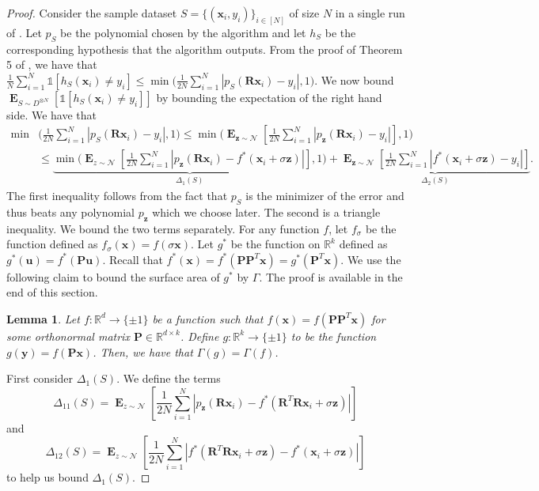 \documentclass[10pt,a4paper]{article}
\newtheorem{lemma}{Lemma}[section]
\renewcommand\vec[1]{\mathbf{#1}}
\DeclareMathOperator*{\E}{\mathbf{E}}
\newcommand{\R}{\mathbb{R}}
\newcommand{\1}{\Ind}
\newcommand{\x}{\vec x}
\newcommand{\z}{\vec z}
\newcommand{\Gauss}{\mathcal{N}}
\newcommand{\ind}{\mathds{1}}
\begin{document}
\begin{proof}
Consider the sample dataset $S=\{(\x_i,y_i)\}_{i\in [N]}$ of size $N$ in a single run of . Let $p_S$ be the polynomial chosen by the algorithm and let $h_S$ be the corresponding hypothesis that the algorithm outputs. From the proof of Theorem 5 of \cite{KKMS:05}, we have that 
$\frac{1}{N}\sum_{i=1}^{N}\ind[h_S(\x_i)\neq y_i]\leq \min\bigl(\frac{1}{2N}\sum_{i=1}^{N}|p_S(\vec R\x_i)-y_i|,1\bigr)$. We now bound $\E_{S\sim D^{\otimes N}}\left[\ind[h_S(\x_i)\neq y_i]\right]$ by bounding the expectation of the right hand side. We have that  
\begin{align*}
\min&\biggl(\frac{1}{2N}\sum_{i=1}^{N}|p_S(\vec R\x_i)-y_i|,1\biggr)
\leq \min\biggl(\E_{\z\sim \Gauss}\left[\frac{1}{2N}\sum_{i=1}^{N}|p_{\z}(\vec R\x_i)-y_i|\right],1\biggr)
\\
&\leq \underbrace{\min\biggl(\E_{z\sim \Gauss}\left[\frac{1}{2N}\sum_{i=1}^{N}|p_{\z}(\vec R\x_i)-f^*(\x_i+\sigma \z)|\right],1\biggr)}_{\Delta_1(S)}+\underbrace{\E_{\z\sim \Gauss}\left[\frac{1}{2N}\sum_{i=1}^{N}|f^*(\x_i+\sigma \z)-y_i|\right]}_{\Delta_2(S)}.
\end{align*}
The first inequality follows from the fact that $p_S$ is the minimizer of the error and thus beats any polynomial $p_{\z}$ which we choose later. The second is a triangle inequality.
We bound the two terms separately.  For any function $f$, let $f_{\sigma}$ be the function defined as $f_{\sigma}(\x)=f(\sigma\x)$. Let $g^*$ be the function on $\R^{k}$ defined as $g^*(\vec u)=f^*(\vec P \vec u)$. Recall that $f^*(\x)=f^*(\vec P\vec P^T\x)=g^*(\vec P^T\x)$. We use the following claim to bound the surface area of $g^*$ by $\Gamma$. The proof is available in the end of this section. 
\begin{lemma}
    \label{lem:sa_low_dimension}
    Let $f:\R^{d}\to\{\pm 1\}$ be a function such that $f(\x)=f(\vec P\vec P^T \x)$ for some orthonormal matrix $\vec P\in \R^{d\times k}$. Define $g:\R^k\to \{\pm 1\}$ to be the function $g(\vec y)=f(\vec P\x)$. Then, we have that $\Gamma(g)=\Gamma(f)$.
\end{lemma}
First consider $\Delta_1(S)$. We define the terms \[\Delta_{11}(S)=\E_{z\sim \Gauss}\left[\frac{1}{2N}\sum_{i=1}^{N}|p_{\z}(\vec R\x_i)-f^*(\vec R^T \vec R\x_i+\sigma\z)|\right]\] and \[\Delta_{12}(S)=\E_{z\sim \Gauss}\left[\frac{1}{2N}\sum_{i=1}^{N}|f^*( \vec R^T \vec R\x_i+\sigma\z)-f^*(\x_i+\sigma \z)|\right]\] to help us bound $\Delta_1(S)$.


\end{proof}
\end{document}
